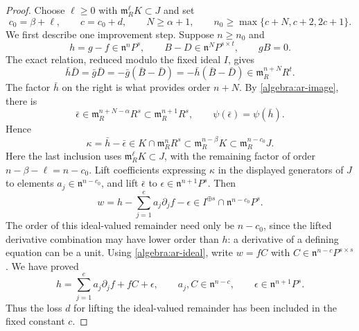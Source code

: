 \begin{proof}
Choose $\ell\ge0$ with $\mathfrak m_R^\ell K\subset J$ and set
\begin{equation}
\label{algebra:constants}
 c_0=\beta+\ell,\qquad c=c_0+d,\qquad
 N\ge\alpha+1,\qquad
 n_0\ge\max\{c+N,c+2,2c+1\}.
\end{equation}
We first describe one improvement step.  Suppose $n\ge n_0$ and
\[
 h=g-f\in\mathfrak n^nP^s,
 \qquad B-D\in\mathfrak n^NP^{s\times t},
 \qquad gB=0.
\]
The exact relation, reduced modulo the fixed ideal $I$, gives
\begin{equation}
\label{algebra:high-order-relation}
 \bar h\bar D
 =\bar g\bar D
 =-\bar g(\bar B-\bar D)
 =-\bar h(\bar B-\bar D)
 \in\mathfrak m_R^{n+N}R^t.
\end{equation}
The factor $\bar h$ on the right is what provides order $n+N$.
By \eqref{algebra:ar-image}, there is
\[
 \bar\epsilon\in\mathfrak m_R^{n+N-\alpha}R^s
 \subset\mathfrak m_R^{n+1}R^s,
 \qquad \psi(\bar\epsilon)=\psi(\bar h).
\]
Hence
\[
 \kappa=\bar h-\bar\epsilon
 \in K\cap\mathfrak m_R^nR^s
 \subset\mathfrak m_R^{n-\beta}K
 \subset\mathfrak m_R^{n-c_0}J.
\]
Here the last inclusion uses $\mathfrak m_R^\ell K\subset J$,
with the remaining factor of order $n-\beta-\ell=n-c_0$.
Lift coefficients expressing $\kappa$ in the displayed generators of
$J$ to elements $a_j\in\mathfrak n^{n-c_0}$, and lift
$\bar\epsilon$ to $\epsilon\in\mathfrak n^{n+1}P^s$.  Then
\[
 w=h-\sum_{j=1}^e a_j\partial_jf-\epsilon
 \in I^{\oplus s}\cap\mathfrak n^{n-c_0}P^s.
\]
The order of this ideal-valued remainder need only be $n-c_0$, since
the lifted derivative combination may have lower order than $h$:
a derivative of a defining equation can be a unit.
Using \eqref{algebra:ar-ideal}, write $w=fC$ with
$C\in\mathfrak n^{n-c}P^{s\times s}$.  We have proved
\begin{equation}
\label{algebra:linear-correction}
 h=\sum_{j=1}^e a_j\partial_jf+fC+\epsilon,
 \qquad
 a_j,C\in\mathfrak n^{n-c},
 \qquad \epsilon\in\mathfrak n^{n+1}P^s.
\end{equation}
Thus the loss $d$ for lifting the ideal-valued remainder has been included
in the fixed constant $c$.


\end{proof}
